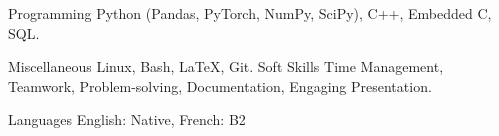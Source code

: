 

\begin{cvskills}

  \cvskill
    {Programming} %
    {Python (Pandas, PyTorch, NumPy, SciPy), C++, Embedded C, SQL.} %

  \cvskill
    {Miscellaneous} %
    {Linux, Bash, \LaTeX, Git.} %
  \cvskill
    {Soft Skills} %
    {Time Management, Teamwork, Problem-solving, Documentation, Engaging Presentation.} %
  
  \cvskill
    {Languages} %
    {English: Native, French: B2} %

\end{cvskills}

